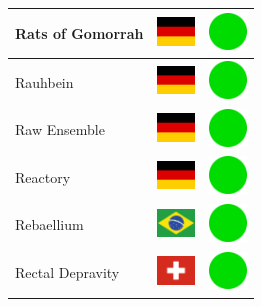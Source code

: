 \documentclass[12pt, a4paper, twoside]{report}
\begin{document}
\begin{center}
\begin{longtable}{|p{5cm}|p{2cm}|p{2cm}|}
 Rats of Gomorrah                                           & \includegraphics[width=1cm]{../img/flags/de} &   \includegraphics[width=1cm]{../likes/y} \\ \hline
 Rauhbein                                                   & \includegraphics[width=1cm]{../img/flags/de} &   \includegraphics[width=1cm]{../likes/y} \\ \hline
 Raw Ensemble                                               & \includegraphics[width=1cm]{../img/flags/de} &   \includegraphics[width=1cm]{../likes/y} \\ \hline
 Reactory                                                   & \includegraphics[width=1cm]{../img/flags/de} &   \includegraphics[width=1cm]{../likes/y} \\ \hline
 Rebaellium                                                 & \includegraphics[width=1cm]{../img/flags/br} &   \includegraphics[width=1cm]{../likes/y} \\ \hline
 Rectal Depravity                                           & \includegraphics[width=1cm]{../img/flags/ch} &   \includegraphics[width=1cm]{../likes/y} \\ \hline

\end{longtable}
\end{center}
\end{document}
